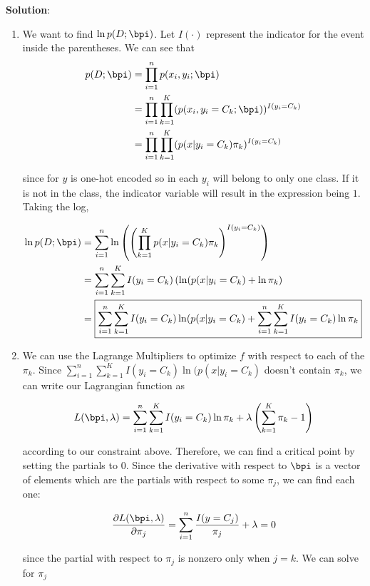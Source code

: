\documentclass[submit]{../harvardml}
\newenvironment{solution}{
    \vspace{2mm}
    \color{blue}\noindent\textbf{Solution}:
}{}
\begin{document}
\begin{solution}

\begin{enumerate}
    \item We want to find $\ln p(D ; \bpi)$. Let $I(\cdot)$ represent the indicator for the event inside the parentheses. We can see that
    \begin{align*}
        p(D ; \bpi) &= \prod_{i=1}^n p(x_i, y_i ; \bpi) \\
        &= \prod_{i=1}^n \prod_{k=1}^K (p(x_i, y_i = C_k; \bpi))^{I(y_i = C_k)} \\
        &= \prod_{i=1}^n \prod_{k=1}^K (p(x | y_i = C_k)\pi_k)^{I(y_i=C_k)}
    \end{align*}

    since for $y$ is one-hot encoded so in each $y_i$ will belong to only one class. If it is not in the class, the indicator variable will result in the expression being $1$. Taking the log,

    \begin{align*}
        \ln p(D ; \bpi) &= \sum_{i=1}^n \ln\left(\left(\prod_{k=1}^Kp(x | y_i = C_k)\pi_k\right)^{I(y_i=C_k)}\right) \\
        &= \sum_{i=1}^n\sum_{k=1}^K I(y_i=C_k)\left(\ln(p(x|y_i=C_k)+\ln \pi_k\right) \\
        &=\boxed{\sum_{i=1}^n\sum_{k=1}^K I(y_i=C_k)\ln(p(x|y_i=C_k) + \sum_{i=1}^n\sum_{k=1}^K I(y_i=C_k) \ln \pi_k}
    \end{align*}

    \item We can use the Lagrange Multipliers to optimize $f$ with respect to each of the $\pi_k$. Since $\sum_{i=1}^n\sum_{k=1}^K I(y_i=C_k)\ln(p(x|y_i=C_k)$ doesn't contain $\pi_k$, we can write our Lagrangian function as

    \[
    L(\bpi, \lambda) = \sum_{i=1}^n \sum_{k=1}^K I(y_i = C_k) \ln \pi_k + \lambda \left(\sum_{k=1}^K \pi_k - 1\right)
    \]

    according to our constraint above. Therefore, we can find a critical point by setting the partials to 0. Since the derivative with respect to $\bpi$ is a vector of elements which are the partials with respect to some $\pi_j$, we can find each one:

    \[
    \frac{\partial L(\bpi, \lambda)}{\partial \pi_j} = \sum_{i=1}^n \frac{I(y=C_j)}{\pi_j} + \lambda = 0
    \]

    since the partial with respect to $\pi_j$ is nonzero only when $j=k$. We can solve for $\pi_j$


\end{enumerate}
\end{solution}
\end{document}
